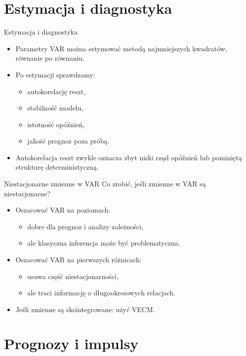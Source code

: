 \documentclass[11pt,aspectratio=169,xcolor=dvipsnames]{beamer}
\begin{document}
\section{Estymacja i diagnostyka}

\begin{frame}{Estymacja i diagnostyka}
  \begin{itemize}
    \item Parametry VAR można estymować metodą najmniejszych kwadratów, równanie po równaniu.
    \item Po estymacji sprawdzamy:
      \begin{itemize}
        \item autokorelację reszt,
        \item stabilność modelu,
        \item istotność opóźnień,
        \item jakość prognoz poza próbą.
      \end{itemize}
    \item Autokorelacja reszt zwykle oznacza zbyt niski rząd opóźnień lub pominiętą strukturę deterministyczną.
  \end{itemize}
\end{frame}

\begin{frame}{Niestacjonarne zmienne w VAR}
  Co zrobić, jeśli zmienne w VAR są niestacjonarne?

  \begin{itemize}
    \item Oszacować VAR na poziomach:
      \begin{itemize}
        \item dobre dla prognoz i analizy zależności,
        \item ale klasyczna inferencja może być problematyczna.
      \end{itemize}
    \item Oszacować VAR na pierwszych różnicach:
      \begin{itemize}
        \item usuwa część niestacjonarności,
        \item ale traci informację o długookresowych relacjach.
      \end{itemize}
    \item Jeśli zmienne są skointegrowane: użyć VECM.
  \end{itemize}
\end{frame}

\section{Prognozy i impulsy}
\end{document}
